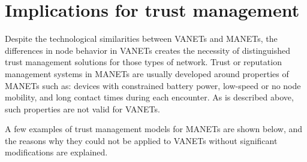 \section{Implications for trust management}

Despite the technological similarities between VANETs and MANETs, the differences in node behavior in VANETs creates the necessity of distinguished trust management solutions for those types of network.
Trust or reputation management systems in MANETs are usually developed around properties of MANETs such as: devices with constrained battery power, low-speed or no node mobility, and long contact times during each encounter.
As is described above, such properties are not valid for VANETs.



A few examples of trust management models for MANETs are shown below, and the reasons why they could not be applied to VANETs without significant modifications are explained.

